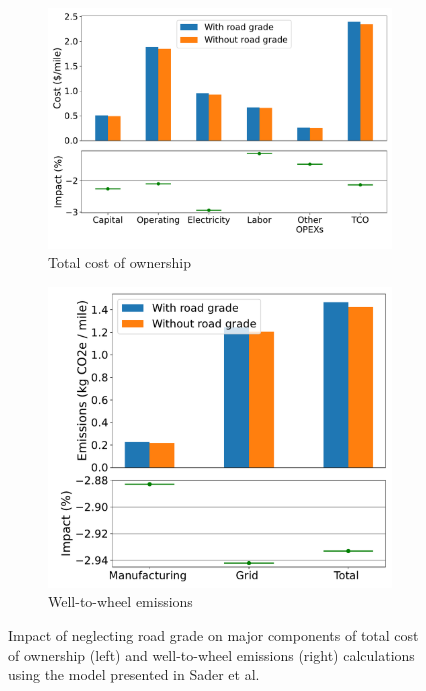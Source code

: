 \begin{figure}[H]
    \centering
    \begin{subfigure}[b]{0.55\textwidth}
        \centering
        \includegraphics[width=\textwidth]{figures/results_comparison_costing.pdf}
        \caption{Total cost of ownership}
        \label{fig:results_comparison_costing}
    \end{subfigure}
    \hfill
    \begin{subfigure}[b]{0.43\textwidth}
        \centering
        \includegraphics[width=\textwidth]{figures/results_comparison_emissions.pdf}
        \caption{Well-to-wheel emissions}
        \label{fig:results_comparison_emissions}
    \end{subfigure}
    \caption{Impact of neglecting road grade on major components of total cost of ownership (left) and well-to-wheel emissions (right) calculations using the model presented in Sader et al. \cite{Sader_2023}}
    \label{fig:road_grade_comparison}
\end{figure}

